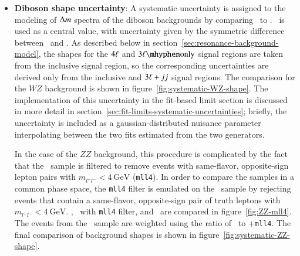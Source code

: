 \begin{itemize}
	\item \textbf{Diboson shape uncertainty}: A systematic uncertainty is assigned to the modeling of $\Delta m$ spectra of the diboson backgrounds by comparing \sherpa\ to \powheg. \sherpa\ is used as a central value, with uncertainty given by the symmetric difference between \sherpa\ and \powheg. As described below in section~\ref{sec:resonance-background-model}, the shapes for the $4\ell$ and $\threelo$ signal regions are taken from the inclusive signal region, so the corresponding uncertainties are derived only from the inclusive and $3\ell+jj$ signal regions. The comparison for the $WZ$ background is shown in figure~\ref{fig:systematic-WZ-shape}. The implementation of this uncertainty in the fit-based limit section is discussed in more detail in section~\ref{sec:fit-limits-systematic-uncertainties}; briefly, the uncertainty is included as a gaussian-distributed nuisance parameter interpolating between the two fits estimated from the two generators.

	In the case of the $ZZ$ background, this procedure is complicated by the fact that the \powheg\ sample is filtered to remove events with same-flavor, opposite-sign lepton pairs with $m_{l^+l^-}<4~\mbox{GeV}$ (\texttt{mll4}). In order to compare the samples in a common phase space, the \texttt{mll4} filter is emulated on the \sherpa\ sample by rejecting events that contain a same-flavor, opposite-sign pair of truth leptons with $m_{l^+l^-}<4~\mbox{GeV}$. \sherpa, \sherpa\ with \texttt{mll4} filter, and \powheg\ are compared in figure~\ref{fig:ZZ-mll4}. The events from the \powheg\ sample are weighted using the ratio of \sherpa\ to \sherpa+\texttt{mll4}. The final comparison of background shapes is shown in figure~\ref{fig:systematic-ZZ-shape}.


\end{itemize}
